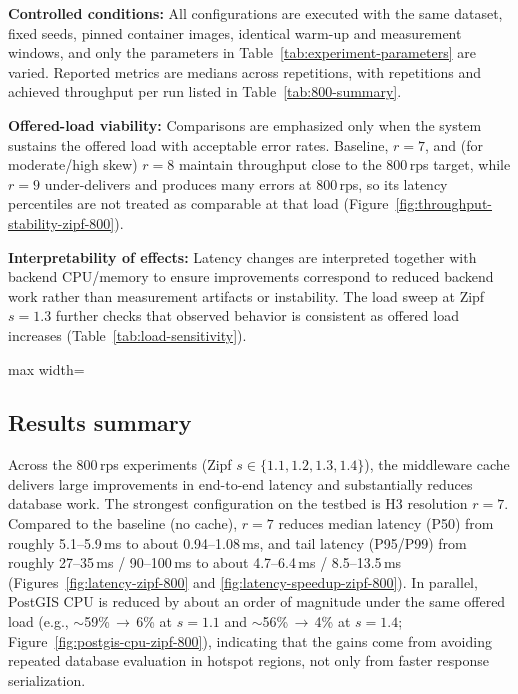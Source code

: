 \textbf{Controlled conditions:} All configurations are executed with the same dataset, fixed seeds, pinned container images, identical warm-up and measurement windows, and only the parameters in Table~\ref{tab:experiment-parameters} are varied. Reported metrics are medians across repetitions, with repetitions and achieved throughput per run listed in Table~\ref{tab:800-summary}.

\textbf{Offered-load viability:} Comparisons are emphasized only when the system sustains the offered load with acceptable error rates. Baseline, $r{=}7$, and (for moderate/high skew) $r{=}8$ maintain throughput close to the 800\,\ac{rps} target, while $r{=}9$ under-delivers and produces many errors at 800\,\ac{rps}, so its latency percentiles are not treated as comparable at that load (Figure~\ref{fig:throughput-stability-zipf-800}).

\textbf{Interpretability of effects:} Latency changes are interpreted together with backend CPU/memory to ensure improvements correspond to reduced backend work rather than measurement artifacts or instability. The load sweep at Zipf $s{=}1.3$ further checks that observed behavior is consistent as offered load increases (Table~\ref{tab:load-sensitivity}).

\begin{table}[tbp]
  \centering
  \caption{Best cache resolution $r$ per Zipf skew at 800\,\ac{rps} based on latency percentiles.}
  \begingroup
    \small
    \setlength{\tabcolsep}{5pt}
    \renewcommand{\arraystretch}{1.05}
    \begin{adjustbox}{max width=\linewidth}
      
    \end{adjustbox}
  \endgroup
\end{table}

\subsection{Results summary}
Across the 800\,\ac{rps} experiments (Zipf $s\in\{1.1,1.2,1.3,1.4\}$), the middleware cache delivers large improvements in end-to-end latency and substantially reduces database work. The strongest configuration on the testbed is H3 resolution $r{=}7$. Compared to the baseline (no cache), $r{=}7$ reduces median latency (P50) from roughly 5.1--5.9\,ms to about 0.94--1.08\,ms, and tail latency (P95/P99) from roughly 27--35\,ms / 90--100\,ms to about 4.7--6.4\,ms / 8.5--13.5\,ms (Figures~\ref{fig:latency-zipf-800} and \ref{fig:latency-speedup-zipf-800}). In parallel, PostGIS CPU is reduced by about an order of magnitude under the same offered load (e.g., $\sim$59\%\,$\rightarrow$\,6\% at $s{=}1.1$ and $\sim$56\%\,$\rightarrow$\,4\% at $s{=}1.4$; Figure~\ref{fig:postgis-cpu-zipf-800}), indicating that the gains come from avoiding repeated database evaluation in hotspot regions, not only from faster response serialization.

